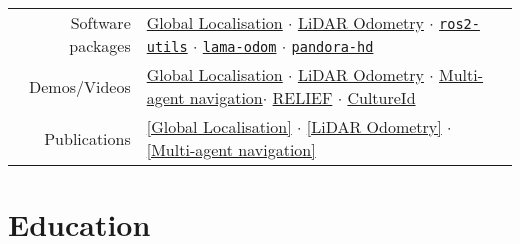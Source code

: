 \documentclass[a4paper,10pt,twoside]{article}
\begin{document}
\begin{center}
\begin{tabular}{rl}
  Software packages &
  \href{https://github.com/cbgl/cbgl}{\hphantom{[}Global Localisation\hphantom{]}} $\cdot$
  \href{https://github.com/fourier-scan-matcher/fsm}{\hphantom{[}LiDAR Odometry\hphantom{]}} $\cdot$
  \href{https://github.com/li9i/ros2-utils}{\texttt{ros2-utils}} $\cdot$
  \href{https://github.com/li9i/lama-odom}{\texttt{lama-odom}} $\cdot$
  \href{https://github.com/li9i/pandora\_vision\_2014/tree/hydro-devel/pandora\_vision\_hole\_detector}{\texttt{pandora-hd}}
  \\

  Demos/Videos &
  \href{https://www.youtube.com/watch?v=xaDKjI0WkDc}{\hphantom{[}Global Localisation\hphantom{]}} $\cdot$
  \href{https://www.youtube.com/watch?v=hB4qsHCEXGI}{\hphantom{[}LiDAR Odometry\hphantom{]}} $\cdot$
  \href{https://www.youtube.com/watch?v=937OZez1iN8}{\hphantom{[}Multi-agent navigation\hphantom{]}}$\cdot$
  \href{https://relief.web.auth.gr/#pg-72-1}{RELIEF} $\cdot$
  \href{https://cultureid.web.auth.gr/?page_id=200&lang=en#pl-200}{CultureId}
  \\
  Publications &
  \href{https://ieeexplore.ieee.org/abstract/document/10802235}{[Global Localisation]} $\cdot$
  \href{https://ieeexplore.ieee.org/abstract/document/9981228}{[LiDAR Odometry]} $\cdot$
  \href{https://www.tandfonline.com/doi/full/10.1080/00207179.2018.1514129}{[Multi-agent navigation]}
\end{tabular}
\end{center}
\verticalspacebetweensections

\section{\textbf{Education}}\verticalspacebetweensectionandcontent
\end{document}
